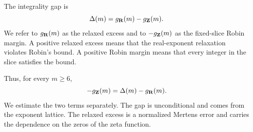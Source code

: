 The integrality gap is
\[
    \Delta(m)=g_{\mathbf{R}}(m)-g_{\mathbf{Z}}(m).
\]
We refer to \(g_{\mathbf{R}}(m)\) as the relaxed excess and to
\(-g_{\mathbf{Z}}(m)\) as the fixed-slice Robin margin. A positive relaxed
excess means that the real-exponent relaxation violates Robin's bound. A
positive Robin margin means that every integer in the slice satisfies the
bound.

Thus, for every \(m\geq6\),
\[
    -g_{\mathbf{Z}}(m)
    =
    \Delta(m)-g_{\mathbf{R}}(m).
\]
We estimate the two terms separately. The gap is unconditional and comes
from the exponent lattice. The
relaxed excess is a normalized Mertens error and carries the dependence on
the zeros of the zeta function.
